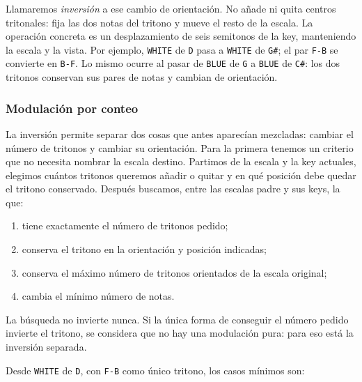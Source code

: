 \documentclass[]{report}
\begin{document}
Llamaremos \emph{inversión} a ese cambio de orientación. No añade ni quita
centros tritonales: fija las dos notas del tritono y mueve el resto de la
escala. La operación concreta es un desplazamiento de seis semitonos de la key,
manteniendo la escala y la vista. Por ejemplo, \texttt{WHITE} de \texttt{D}
pasa a \texttt{WHITE} de \texttt{G\#}; el par \texttt{F-B} se convierte en
\texttt{B-F}. Lo mismo ocurre al pasar de \texttt{BLUE} de \texttt{G} a
\texttt{BLUE} de \texttt{C\#}: los dos tritonos conservan sus pares de notas y
cambian de orientación.

\subsubsection*{Modulación por conteo}

La inversión permite separar dos cosas que antes aparecían mezcladas: cambiar
el número de tritonos y cambiar su orientación. Para la primera tenemos un
criterio que no necesita nombrar la escala destino. Partimos de la escala y la
key actuales, elegimos cuántos tritonos queremos añadir o quitar y en qué
posición debe quedar el tritono conservado. Después buscamos, entre las escalas
padre y sus keys, la que:

\begin{enumerate}
	\item tiene exactamente el número de tritonos pedido;
	\item conserva el tritono en la orientación y posición indicadas;
	\item conserva el máximo número de tritonos orientados de la escala original;
	\item cambia el mínimo número de notas.
\end{enumerate}

La búsqueda no invierte nunca. Si la única forma de conseguir el número pedido
invierte el tritono, se considera que no hay una modulación pura: para eso está
la inversión separada.

Desde \texttt{WHITE} de \texttt{D}, con \texttt{F-B} como único tritono, los
casos mínimos son:

\begin{table}[H]
	\centering
	\caption{Modulación por conteo desde \texttt{WHITE} de \texttt{D}.}
	\label{tab:tritone-count-examples}
\end{table}
\end{document}
